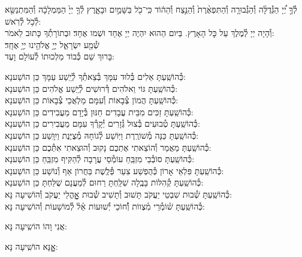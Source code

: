 \documentclass[twoside, openany, parskip=half, 11pt]{book}
\begin{document}
לְ֯ךָ֣ יְ֠יָ הַגְּ֯דֻלָּ֨ה וְ֯הַגְּ֯בוּרָ֤ה וְ֯הַתִּפְאֶ֨רֶת֙ וְ֯הַנֵּ֣צַח וְ֯הַה֔וֹד
כִּֽי־כֹ֖ל בַּשָּׁמַ֣יִם וּבָאָ֑רֶץ לְ֯ךָ֤ יְיָ֙ הַמַּמְלָכָ֔ה
וְ֯הַמִּתְנַשֵּׂ֖א לְ֯כֹ֥ל לְ֯רֹֽאשׁ:\\
וְ֯הָיָה יְיָ לְ֯מֶלֶךְ עַל כׇּל הָאָרֶץ. בַּיּום הַהוּא יִהְיֶה יְיָ אֶחָד וּשְׁמו אֶחָד׃ וּבְתוֹרָתְ֯ךָ כָּתוּב לֵאמֹר: \\
שְׁ֯מַ֖ע יִשְׂרָאֵ֑ל יְיָ֥ אֱלֹהֵ֖ינוּ יְיָ֥ אֶחָֽד׃\\
בָּרוּךְ שֵׁם כְּ֯בוֹד מַלְכוּתוֹ לְ֯עוֹלָם וָעֶד:

\begin{small}
כְּ֯הוֹשַֽׁעְתָּ אֵלִים בְּ֯לוּד עִמָּךְ בְּ֯צֵאתְ֯ךָ לְ֯יֵֽשַׁע עַמָּךְ \hfill כֵּן הוֹשַׁענָא: \\
כְּ֯הוֹשַֽׁעְתָּ גּוֹי וֵאלֹהִים דְּ֯רוּשִׁים לְ֯יֵֽשַׁע אֱלֹהִים \hfill כֵּן הוֹשַׁענָא: \\
כְּ֯הוֹשַֽׁעְתָּ הֲמוֹן צְ֯בָאוֹת וְ֯עִמָּם מַלְאֲכֵי צְ֯בָאוֹת \hfill כֵּן הוֹשַׁענָא: \\
כְּ֯הוֹשַֽׁעְתָּ זַכִּים מִבֵּית עֲבָדִים חַנּוּן בְּ֯יָדָם מַעֲבִידִים \hfill כֵּן הוֹשַׁענָא: \\
כְּ֯הוֹשַֽׁעְתָּ טְ֯בוּעִים בְּ֯צוּל גְּ֯זָרִים יְ֯קָרְ֯ךָ עִמָּם מַעֲבִירִים \hfill כֵּן הוֹשַׁענָא: \\
כְּ֯הוֹשַֽׁעְתָּ כַּנָּה מְ֯שׁוֹרֶֽרֶת וַיּֽוֹשַׁע לְ֯גוֹחָהּ מְ֯צֻיֶּנֶת וַיִוָּֽשַׁע \hfill כֵּן הוֹשַׁענָא: \\
כְּ֯הוֹשַֽׁעְתָּ מַאֲמַר וְ֯הוֹצֵאתִי אֶתְכֶם נָקוּב וְ֯הוּצֵאתִי אִתְּ֯כֶם \hfill כֵּן הוֹשַׁענָא:\\
כְּ֯הוֹשַֽׁעְתָּ סוֹבְ֯בֵי מִזְבֵּֽחַ עוֹמְ֯סֵי עֲרָבָה לְ֯הַקִּיף מִזְבֵּֽחַ \hfill כֵּן הוֹשַׁענָא: \\
כְּ֯הוֹשַֽׁעְתָּ פִּלְאֵי אָרוֹן כְּ֯הֻפְשַׁע צִעֵר פְּ֯לֶֽשֶׁת בַּחֲרוֹן אַף וְ֯נוֹשַׁע \hfill כֵּן הוֹשַׁענָא: \\
כְּ֯הוֹשַֽׁעְתָּ קְ֯הִלּוֹת בָּבֶֽלָה שִׁלַּֽחְתָּ רַחוּם לְ֯מַעֲנָם שֻׁלַּחְתָּ \hfill כֵּן הוֹשַׁענָא:\\
כְּ֯הוֹשַֽׁעְתָּ שְׁ֯בוּת שִׁבְטֵי יַעֲקֹב תָּשׁוּב וְ֯תָשִׁיב שְׁ֯בוּת אׇׇׇׇׇהֳלֵי יַעֲקֹב \hfill וְ֯הוֹשִׁיעָה נָּא:\\
כְּ֯הוֹשַֽׁעְתָּ שׁ֗וֹמְ֯רֵי מִ֗צְווֹת וְ֯֗חוֹכֵי יְ֯שׁוּעוֹת אֵ֗ל֗ לְ֯מוֹשָׁעוֹת \hfill וְ֯הוֹשִׁיעָה נָּא:

\end{small}

\begin{large}
\chazzan
אֲנִי וָהוֹ הוֹשִֽיעָה נָּא:

\shatzvkahal
אׇׇׇׇׇנָּא הוֹשִֽׁיעָה נָּא:

\end{large}
\end{document}

